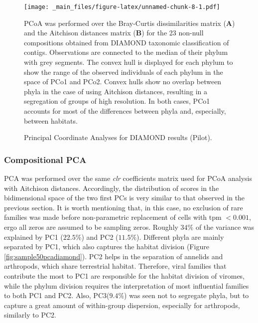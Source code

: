 \documentclass[
  openany]{book}
\begin{document}
\begin{figure}[!htbp]

\texttt{[image: \_main\_files/figure-latex/unnamed-chunk-8-1.pdf]}

\caption{Principal Coordinate Analyses for DIAMOND results (Pilot).\label{fig:sample50pcoadiamond}}
PCoA was performed over the Bray-Curtis dissimilarities matrix (\textbf{A}) and the Aitchison distances matrix (\textbf{B}) for the 23 non-null compositions obtained from DIAMOND taxonomic classification of contigs. Observations are connected to the median of their phylum with grey segments. The convex hull is displayed for each phylum to show the range of the observed individuals of each phylum in the space of PCo1 and PCo2. Convex hulls show no overlap between phyla in the case of using Aitchison distances, resulting in a segregation of groups of high resolution. In both cases, PCo1 accounts for most of the differences between phyla and, especially, between habitats.

\end{figure}

\hypertarget{compositional-pca}{%
\subsubsection{Compositional PCA}\label{compositional-pca}}

PCA was performed over the same \emph{clr} coefficients matrix used for PCoA analysis with Aitchison distances. Accordingly, the distribution of scores in the bidimensional space of the two first PCs is very similar to that observed in the previous section. It is worth mentioning that, in this case, no exclusion of rare families was made before non-parametric replacement of cells with tpm \(< 0.001\), ergo all zeros are assumed to be sampling zeros. Roughly \(34\%\) of the variance was explained by PC1 (\(22.5\%\)) and PC2 (\(11.5\%\)). Different phyla are mainly separated by PC1, which also captures the habitat division (Figure \ref{fig:sample50pcadiamond}). PC2 helps in the separation of annelids and arthropods, which share terrestrial habitat. Therefore, viral families that contribute the most to PC1 are responsible for the habitat division of viromes, while the phylum division requires the interpretation of most influential families to both PC1 and PC2. Also, PC3(\(9.4\%\)) was seen not to segregate phyla, but to capture a great amount of within-group dispersion, especially for arthropods, similarly to PC2.
\end{document}
